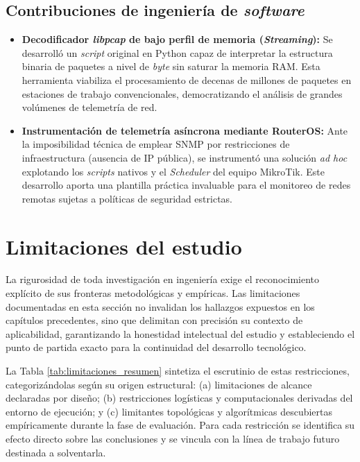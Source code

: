 \documentclass[12pt]{report}
\begin{document}
\subsection*{Contribuciones de ingeniería de \textit{software}}

\begin{itemize}
    \item \textbf{Decodificador \textit{libpcap} de bajo perfil de memoria (\textit{Streaming}):} Se desarrolló un \textit{script} original en Python capaz de interpretar la estructura binaria de paquetes a nivel de \textit{byte} sin saturar la memoria RAM. Esta herramienta viabiliza el procesamiento de decenas de millones de paquetes en estaciones de trabajo convencionales, democratizando el análisis de grandes volúmenes de telemetría de red.
    \item \textbf{Instrumentación de telemetría asíncrona mediante RouterOS:} Ante la imposibilidad técnica de emplear SNMP por restricciones de infraestructura (ausencia de IP pública), se instrumentó una solución \textit{ad hoc} explotando los \textit{scripts} nativos y el \textit{Scheduler} del equipo MikroTik. Este desarrollo aporta una plantilla práctica invaluable para el monitoreo de redes remotas sujetas a políticas de seguridad estrictas.
\end{itemize}

\section{Limitaciones del estudio}
\label{sec:limitaciones}

La rigurosidad de toda investigación en ingeniería exige el reconocimiento explícito de sus fronteras metodológicas y empíricas. Las limitaciones documentadas en esta sección no invalidan los hallazgos expuestos en los capítulos precedentes, sino que delimitan con precisión su contexto de aplicabilidad, garantizando la honestidad intelectual del estudio y estableciendo el punto de partida exacto para la continuidad del desarrollo tecnológico.

La Tabla \ref{tab:limitaciones_resumen} sintetiza el escrutinio de estas restricciones, categorizándolas según su origen estructural: (a) limitaciones de alcance declaradas por diseño; (b) restricciones logísticas y computacionales derivadas del entorno de ejecución; y (c) limitantes topológicas y algorítmicas descubiertas empíricamente durante la fase de evaluación. Para cada restricción se identifica su efecto directo sobre las conclusiones y se vincula con la línea de trabajo futuro destinada a solventarla.
\end{document}
